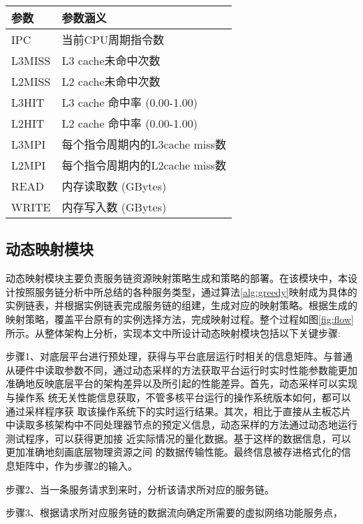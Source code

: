 \begin{table}[!htb]
	\centering
	\begin{tabular}{ | l | p{7cm} |}\hline
		\textbf{参数} &							 \textbf{参数涵义}  				\\ 	\hline
		IPC   & 当前CPU周期指令数\\ \hline
		L3MISS & L3 cache未命中次数\\ \hline
		L2MISS & L2 cache未命中次数\\ \hline
		L3HIT & L3 cache 命中率 (0.00-1.00)\\ \hline
		L2HIT & L2 cache 命中率 (0.00-1.00)\\ \hline
		L3MPI & 每个指令周期内的L3cache miss数\\ \hline
		L2MPI & 每个指令周期内的L2cache miss数\\ \hline
		READ  & 内存读取数 (GBytes)\\ \hline
		WRITE & 内存写入数 (GBytes)\\ \hline
	\end{tabular}
\end{table}


\subsection{动态映射模块}
动态映射模块主要负责服务链资源映射策略生成和策略的部署。在该模块中，本设计按照服务链分析中所总结的各种服务类型，通过算法\ref{alg:greedy}映射成为具体的实例链表，并根据实例链表完成服务链的组建，生成对应的映射策略。根据生成的映射策略，覆盖平台原有的实例选择方法，完成映射过程。整个过程如图\ref{fig:flow}所示。从整体架构上分析，实现本文中所设计动态映射模块包括以下关键步骤:

步骤1、对底层平台进行预处理，获得与平台底层运行时相关的信息矩阵。与普通从硬件中读取参数不同，通过动态采样的方法获取平台运行时实时性能参数能更加准确地反映底层平台的架构差异以及所引起的性能差异。首先，动态采样可以实现与操作系 统无关性能信息获取，不管多核平台运行的操作系统版本如何，都可以通过采样程序获 取该操作系统下的实时运行结果。其次，相比于直接从主板芯片中读取多核架构中不同处理器节点的预定义信息，动态采样的方法通过动态地运行测试程序，可以获得更加接 近实际情况的量化数据。基于这样的数据信息，可以更加准确地刻画底层物理资源之间 的数据传输性能。最终信息被存进格式化的信息矩阵中，作为步骤2的输入。

步骤2、当一条服务请求到来时，分析该请求所对应的服务链。

步骤3、根据请求所对应服务链的数据流向确定所需要的虚拟网络功能服务点，

